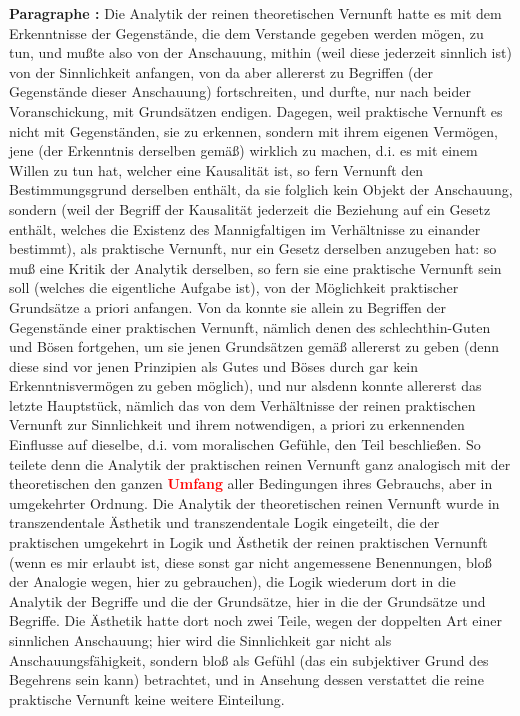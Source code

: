 \documentclass[a4paper,12pt,twoside]{book}
\newcommand{\match}[1]{\textcolor{red}{\textbf{#1}}}
\begin{document}
	\noindent\textbf{Paragraphe : }Die Analytik der reinen theoretischen Vernunft hatte es mit dem Erkenntnisse der Gegenstände, die dem Verstande gegeben werden mögen, zu tun, und mußte also von der Anschauung, mithin (weil diese jederzeit sinnlich ist) von der Sinnlichkeit anfangen, von da aber allererst zu Begriffen (der Gegenstände dieser Anschauung) fortschreiten, und durfte, nur nach beider Voranschickung, mit Grundsätzen endigen. Dagegen, weil praktische Vernunft es nicht mit Gegenständen, sie zu erkennen, sondern mit ihrem eigenen Vermögen, jene (der Erkenntnis derselben gemäß) wirklich zu machen, d.i. es mit einem Willen zu tun hat, welcher eine Kausalität ist, so fern Vernunft den Bestimmungsgrund derselben enthält, da sie folglich kein Objekt der Anschauung, sondern (weil der Begriff der Kausalität jederzeit die Beziehung auf ein Gesetz enthält, welches die Existenz des Mannigfaltigen im Verhältnisse zu einander bestimmt), als praktische Vernunft, nur ein Gesetz derselben anzugeben hat: so muß eine Kritik der Analytik derselben, so fern sie eine praktische Vernunft sein soll (welches die eigentliche Aufgabe ist), von der Möglichkeit praktischer Grundsätze a priori anfangen. Von da konnte sie allein zu Begriffen der Gegenstände einer praktischen Vernunft, nämlich denen des schlechthin-Guten und Bösen fortgehen, um sie jenen Grundsätzen gemäß allererst zu geben (denn diese sind vor jenen Prinzipien als Gutes und Böses durch gar kein Erkenntnisvermögen zu geben möglich), und nur alsdenn konnte allererst das letzte Hauptstück, nämlich das von dem Verhältnisse der reinen praktischen Vernunft zur Sinnlichkeit und ihrem notwendigen, a priori zu erkennenden Einflusse auf dieselbe, d.i. vom moralischen Gefühle, den Teil beschließen. So teilete  denn die Analytik der praktischen reinen Vernunft ganz analogisch mit der theoretischen den ganzen \match{Umfang} aller Bedingungen ihres Gebrauchs, aber in umgekehrter Ordnung. Die Analytik der theoretischen reinen Vernunft wurde in transzendentale Ästhetik und transzendentale Logik eingeteilt, die der praktischen umgekehrt in Logik und Ästhetik der reinen praktischen Vernunft (wenn es mir erlaubt ist, diese sonst gar nicht angemessene Benennungen, bloß der Analogie wegen, hier zu gebrauchen), die Logik wiederum dort in die Analytik der Begriffe und die der Grundsätze, hier in die der Grundsätze und Begriffe. Die Ästhetik hatte dort noch zwei Teile, wegen der doppelten Art einer sinnlichen Anschauung; hier wird die Sinnlichkeit gar nicht als Anschauungsfähigkeit, sondern bloß als Gefühl (das ein subjektiver Grund des Begehrens sein kann) betrachtet, und in Ansehung dessen verstattet die reine praktische Vernunft keine weitere Einteilung. 
	
\end{document}
